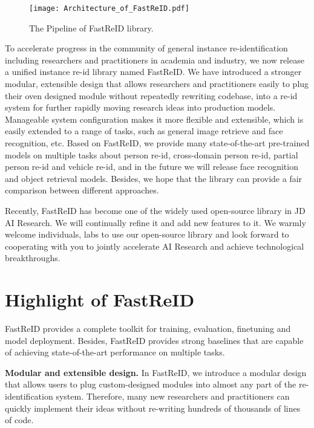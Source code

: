 \documentclass[10pt,twocolumn,letterpaper]{article}
\begin{document}
\begin{figure*}[t]
    \centering
       \vspace{0em}
    \texttt{[image: Architecture\_of\_FastReID.pdf]}
     \caption{The Pipeline of FastReID library.}\label{fig1}
    \vspace{-1em}
\end{figure*}

To accelerate progress in the community of general instance re-identification including researchers and practitioners in academia and industry, we now release a unified instance re-id library named FastReID. We have introduced a stronger modular, extensible design that allows researchers and practitioners easily to plug their oven designed module without repeatedly rewriting codebase, into a re-id system for further rapidly moving research ideas into production models. Manageable system configuration makes it more flexible and extensible, which is easily extended to a range of tasks, such as general image retrieve and face recognition, etc. Based on FastReID, we provide many state-of-the-art pre-trained models on multiple tasks about person re-id, cross-domain person re-id, partial person re-id and vehicle re-id, and in the future we will release face recognition and object retrieval models. Besides, we hope that the library can provide a fair comparison between different approaches. 

Recently, FastReID has become one of the widely used open-source library in JD AI Research. We will continually refine it and add new features to it. We warmly welcome individuals, labs to use our open-source library and look forward to cooperating with you to jointly accelerate AI Research and achieve technological breakthroughs.

\section{Highlight of FastReID}
FastReID provides a complete toolkit for training, evaluation, finetuning and model deployment. Besides, FastReID provides strong baselines that are capable of achieving state-of-the-art performance on multiple tasks.

\noindent\textbf{Modular and extensible design.} In FastReID, we introduce a modular design that allows users to plug custom-designed modules into almost any part of the re-identification system. Therefore, many new researchers and practitioners can quickly implement their ideas without re-writing hundreds of thousands of lines of code.
\end{document}
